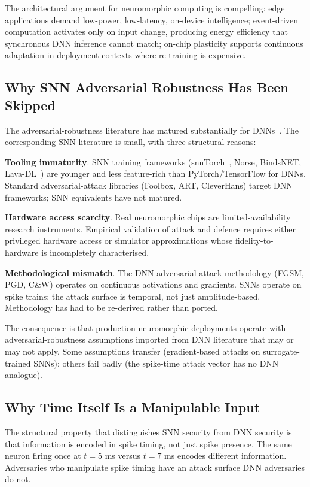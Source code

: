 \documentclass[sigconf,nonacm]{acmart}
\begin{document}
The architectural argument for neuromorphic computing is
compelling: edge applications demand low-power, low-latency,
on-device intelligence; event-driven computation activates only on
input change, producing energy efficiency that synchronous
DNN inference cannot match; on-chip plasticity supports continuous
adaptation in deployment contexts where re-training is
expensive.

\subsection{Why SNN Adversarial Robustness Has Been Skipped}

The adversarial-robustness literature has matured substantially for
DNNs~\cite{biggio2018wild,goodfellow2014fgsm,madry2018towards,
carlini2017cw}. The corresponding SNN literature is small, with
three structural reasons:

\textbf{Tooling immaturity}. SNN training frameworks
(snnTorch~\cite{eshraghian2023snntorch}, Norse, BindsNET,
Lava-DL~\cite{intel2024lava}) are younger and less feature-rich than
PyTorch/TensorFlow for DNNs. Standard adversarial-attack libraries
(Foolbox, ART, CleverHans) target DNN frameworks; SNN equivalents
have not matured.

\textbf{Hardware access scarcity}. Real neuromorphic chips are
limited-availability research instruments. Empirical validation of
attack and defence requires either privileged hardware access or
simulator approximations whose fidelity-to-hardware is incompletely
characterised.

\textbf{Methodological mismatch}. The DNN adversarial-attack
methodology (FGSM, PGD, C\&W) operates on continuous activations
and gradients. SNNs operate on spike trains; the attack surface is
temporal, not just amplitude-based. Methodology has had to be
re-derived rather than ported.

The consequence is that production neuromorphic deployments operate
with adversarial-robustness assumptions imported from DNN literature
that may or may not apply. Some assumptions transfer (gradient-based
attacks on surrogate-trained SNNs); others fail badly (the
spike-time attack vector has no DNN analogue).

\subsection{Why Time Itself Is a Manipulable Input}

The structural property that distinguishes SNN security from DNN
security is that information is encoded in spike timing, not just
spike presence. The same neuron firing once at $t = 5$ ms versus
$t = 7$ ms encodes different information. Adversaries who
manipulate spike timing have an attack surface DNN adversaries
do not.
\end{document}
